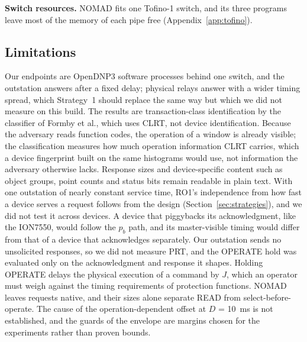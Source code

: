 \textbf{Switch resources.} NOMAD fits one Tofino-1 switch, and its three programs leave most of the memory of each pipe free (Appendix~\ref{app:tofino}). %

\subsection{Limitations}

Our endpoints are OpenDNP3 software processes behind one switch, and the outstation answers after a fixed delay; physical relays answer with a wider timing spread, which Strategy~1 should replace the same way but which we did not measure on this build. The results are transaction-class identification by the classifier of Formby et al., which uses CLRT, not device identification. Because the adversary reads function codes, the operation of a window is already visible; the classification measures how much operation information CLRT carries, which a device fingerprint built on the same histograms would use, not information the adversary otherwise lacks. Response sizes and device-specific content such as object groups, point counts and status bits remain readable in plain text. With one outstation of nearly constant service time, RO1's independence from how fast a device serves a request follows from the design (Section~\ref{sec:strategies}), and we did not test it across devices. A device that piggybacks its acknowledgment, like the ION7550, would follow the $p_b$ path, and its master-visible timing would differ from that of a device that acknowledges separately. Our outstation sends no unsolicited responses, so we did not measure PRT, and the OPERATE hold was evaluated only on the acknowledgment and response it shapes. Holding OPERATE delays the physical execution of a command by $J$, which an operator must weigh against the timing requirements of protection functions. NOMAD leaves requests native, and their sizes alone separate READ from select-before-operate. The cause of the operation-dependent offset at $D$ = 10~ms is not established, and the guards of the envelope are margins chosen for the experiments rather than proven bounds.
